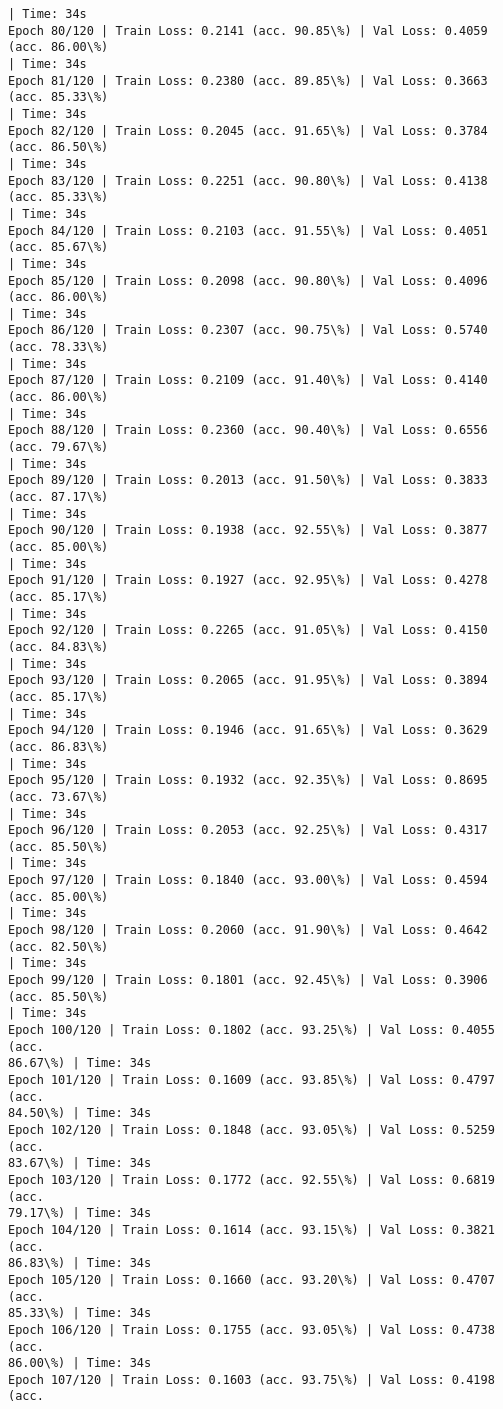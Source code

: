 \documentclass[8pt]{extarticle}
\begin{document}
\begin{Verbatim}[commandchars=\\\{\}]
| Time: 34s
Epoch 80/120 | Train Loss: 0.2141 (acc. 90.85\%) | Val Loss: 0.4059 (acc. 86.00\%)
| Time: 34s
Epoch 81/120 | Train Loss: 0.2380 (acc. 89.85\%) | Val Loss: 0.3663 (acc. 85.33\%)
| Time: 34s
Epoch 82/120 | Train Loss: 0.2045 (acc. 91.65\%) | Val Loss: 0.3784 (acc. 86.50\%)
| Time: 34s
Epoch 83/120 | Train Loss: 0.2251 (acc. 90.80\%) | Val Loss: 0.4138 (acc. 85.33\%)
| Time: 34s
Epoch 84/120 | Train Loss: 0.2103 (acc. 91.55\%) | Val Loss: 0.4051 (acc. 85.67\%)
| Time: 34s
Epoch 85/120 | Train Loss: 0.2098 (acc. 90.80\%) | Val Loss: 0.4096 (acc. 86.00\%)
| Time: 34s
Epoch 86/120 | Train Loss: 0.2307 (acc. 90.75\%) | Val Loss: 0.5740 (acc. 78.33\%)
| Time: 34s
Epoch 87/120 | Train Loss: 0.2109 (acc. 91.40\%) | Val Loss: 0.4140 (acc. 86.00\%)
| Time: 34s
Epoch 88/120 | Train Loss: 0.2360 (acc. 90.40\%) | Val Loss: 0.6556 (acc. 79.67\%)
| Time: 34s
Epoch 89/120 | Train Loss: 0.2013 (acc. 91.50\%) | Val Loss: 0.3833 (acc. 87.17\%)
| Time: 34s
Epoch 90/120 | Train Loss: 0.1938 (acc. 92.55\%) | Val Loss: 0.3877 (acc. 85.00\%)
| Time: 34s
Epoch 91/120 | Train Loss: 0.1927 (acc. 92.95\%) | Val Loss: 0.4278 (acc. 85.17\%)
| Time: 34s
Epoch 92/120 | Train Loss: 0.2265 (acc. 91.05\%) | Val Loss: 0.4150 (acc. 84.83\%)
| Time: 34s
Epoch 93/120 | Train Loss: 0.2065 (acc. 91.95\%) | Val Loss: 0.3894 (acc. 85.17\%)
| Time: 34s
Epoch 94/120 | Train Loss: 0.1946 (acc. 91.65\%) | Val Loss: 0.3629 (acc. 86.83\%)
| Time: 34s
Epoch 95/120 | Train Loss: 0.1932 (acc. 92.35\%) | Val Loss: 0.8695 (acc. 73.67\%)
| Time: 34s
Epoch 96/120 | Train Loss: 0.2053 (acc. 92.25\%) | Val Loss: 0.4317 (acc. 85.50\%)
| Time: 34s
Epoch 97/120 | Train Loss: 0.1840 (acc. 93.00\%) | Val Loss: 0.4594 (acc. 85.00\%)
| Time: 34s
Epoch 98/120 | Train Loss: 0.2060 (acc. 91.90\%) | Val Loss: 0.4642 (acc. 82.50\%)
| Time: 34s
Epoch 99/120 | Train Loss: 0.1801 (acc. 92.45\%) | Val Loss: 0.3906 (acc. 85.50\%)
| Time: 34s
Epoch 100/120 | Train Loss: 0.1802 (acc. 93.25\%) | Val Loss: 0.4055 (acc.
86.67\%) | Time: 34s
Epoch 101/120 | Train Loss: 0.1609 (acc. 93.85\%) | Val Loss: 0.4797 (acc.
84.50\%) | Time: 34s
Epoch 102/120 | Train Loss: 0.1848 (acc. 93.05\%) | Val Loss: 0.5259 (acc.
83.67\%) | Time: 34s
Epoch 103/120 | Train Loss: 0.1772 (acc. 92.55\%) | Val Loss: 0.6819 (acc.
79.17\%) | Time: 34s
Epoch 104/120 | Train Loss: 0.1614 (acc. 93.15\%) | Val Loss: 0.3821 (acc.
86.83\%) | Time: 34s
Epoch 105/120 | Train Loss: 0.1660 (acc. 93.20\%) | Val Loss: 0.4707 (acc.
85.33\%) | Time: 34s
Epoch 106/120 | Train Loss: 0.1755 (acc. 93.05\%) | Val Loss: 0.4738 (acc.
86.00\%) | Time: 34s
Epoch 107/120 | Train Loss: 0.1603 (acc. 93.75\%) | Val Loss: 0.4198 (acc.

\end{Verbatim}
\end{document}
